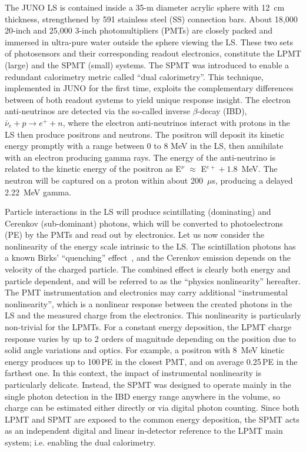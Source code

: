 \documentclass[a4paper,10pt,twoside]{cpc-hepnp}
\begin{document}
\begin{CJK*}{GB}{gbsn}
\begin{multicols}{2}
The JUNO LS is contained inside a 35-m diameter acrylic sphere with
12~cm thickness, strengthened by 591 stainless steel (SS) connection
bars. About 18,000 20-inch and 25,000 3-inch photomultipliers (PMTs)
are closely packed and immersed in ultra-pure water outside the sphere
viewing the LS. 
  These two sets of photosensors and their
  corresponding readout electronics, constitute the LPMT (large) and
  the SPMT (small) systems.  The SPMT was introduced to enable a
  redundant calorimetry metric called ``dual calorimetry''.  This
  technique, implemented in JUNO for the first time, exploits the
  complementary differences between of both readout systems to yield
  unique response insight. The electron anti-neutrinos are detected
via the so-called inverse $\beta$-decay (IBD), $\bar{\nu}_{e}+p
\rightarrow e^{+}+n$, where the electron anti-neutrinos interact with
protons in the LS then produce positrons and neutrons.  The positron
will deposit its kinetic energy promptly with a range between 0 to 8
MeV in the LS, then annihilate with an electron producing gamma rays.
The energy of the anti-neutrino is related to the kinetic energy of
the positron as E$^{\nu}$ $\approx$ E$^{e+}+1.8$~MeV. The neutron will
be captured on a proton within about 200~$\mu$s,
producing a delayed 2.22~MeV gamma.

Particle interactions in the LS will produce scintillating
(dominating) and Cerenkov (sub-dominant) photons, which will be
converted to photoelectrons (PE) by the PMTs and read out
by electronics. Let us now consider the nonlinearity of the energy
scale intrinsic to the LS. The scintillation photons has a known
Birks' ``quenching'' effect~\cite{PDG}, and the Cerenkov emission
depends on the velocity of the charged particle. The combined effect
is clearly both energy and particle dependent, and will be referred to
as the ``physics nonlinearity'' hereafter. The PMT instrumentation and
electronics may carry additional ``instrumental nonlinearity'', which
is a nonlinear response between the created photons in the LS and the
measured charge from the electronics. This nonlinearity is
particularly non-trivial for the LPMTs.  
  For a constant energy deposition, the LPMT charge response varies by
  up to 2 orders of magnitude depending on the position due to solid
  angle variations and optics.  For example, a positron with 8~MeV
  kinetic energy produces up to 100\,PE in the closest PMT, and on
  average 0.25\,PE in the farthest one. In this context, the impact of
  instrumental nonlinearity is particularly delicate.  Instead,
  the SPMT was designed to operate mainly in the single photon
  detection in the IBD energy range anywhere in the volume, so charge
  can be estimated either directly or via digital photon counting.
  Since both LPMT and SPMT are exposed to the common energy
  deposition, the SPMT acts as an independent digital and linear
  in-detector reference to the LPMT main system; i.e. enabling the
  dual calorimetry.


\end{multicols}
\end{CJK*}
\end{document}

